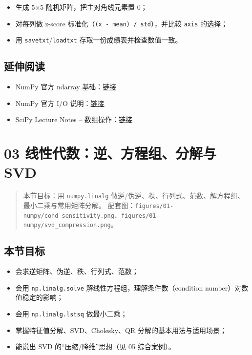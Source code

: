 \begin{itemize}
\tightlist
\item
  生成 5×5 随机矩阵，把主对角线元素置 0；
\item
  对每列做 z-score 标准化（\texttt{(x\ -\ mean)\ /\ std}），并比较
  \texttt{axis} 的选择；
\item
  用 \texttt{savetxt}/\texttt{loadtxt} 存取一份成绩表并检查数值一致。
\end{itemize}

\subsection{延伸阅读}\label{ux5ef6ux4f38ux9605ux8bfb-1}

\begin{itemize}
\tightlist
\item
  NumPy 官方 ndarray
  基础：\href{https://numpy.org/doc/stable/user/quickstart.html}{链接}
\item
  NumPy 官方 I/O
  说明：\href{https://numpy.org/doc/stable/reference/routines.io.html}{链接}
\item
  SciPy Lecture Notes --
  数组操作：\href{https://scipy-lectures.org/intro/numpy/operations.html}{链接}
\end{itemize}

\section{03 线性代数：逆、方程组、分解与
SVD}\label{ux7ebfux6027ux4ee3ux6570ux9006ux65b9ux7a0bux7ec4ux5206ux89e3ux4e0e-svd}

\begin{quote}
本节目标：用 \texttt{numpy.linalg}
做逆/伪逆、秩、行列式、范数、解方程组、最小二乘与常用矩阵分解。
配套图：\texttt{figures/01-numpy/cond\_sensitivity.png}、\texttt{figures/01-numpy/svd\_compression.png}。
\end{quote}

\subsection{本节目标}\label{ux672cux8282ux76eeux6807-9}

\begin{itemize}
\tightlist
\item
  会求逆矩阵、伪逆、秩、行列式、范数；
\item
  会用 \texttt{np.linalg.solve} 解线性方程组，理解条件数（condition
  number）对数值稳定的影响；
\item
  会用 \texttt{np.linalg.lstsq} 做最小二乘；
\item
  掌握特征值分解、SVD、Cholesky、QR 分解的基本用法与适用场景；
\item
  能说出 SVD 的``压缩/降维''思想（见 05 综合案例）。
\end{itemize}

